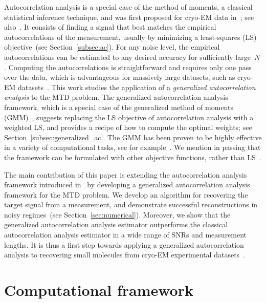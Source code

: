\documentclass{article}
\begin{document}
Autocorrelation analysis is a special case of the method of moments, a classical statistical inference technique, {and was first proposed for cryo-EM data in~\cite{kam1980reconstruction}; see also~\cite{bhamre2015orthogonal,bhamre2017anisotropic,levin20183d}}. It consists of finding a signal that best matches the empirical autocorrelations of the measurement, {usually} by minimizing a least-squares (LS) objective~(see Section~\ref{subsec:ac}). For any noise level, the empirical autocorrelations can be estimated to any desired accuracy for sufficiently large~$N$. Computing the autocorrelations is straightforward and requires only one pass over the data, which is advantageous for massively large datasets, such as \mbox{cryo-EM} datasets~\cite{bendory2020single}. This work studies the application of a \textit{generalized autocorrelation analysis} to the MTD problem. The generalized autocorrelation analysis framework, which is a special case of the generalized method of moments (GMM)~\cite{Hansen1982}, suggests replacing the LS objective of autocorrelation analysis with a weighted LS, and provides a recipe of how to compute the optimal weights; see Section~\ref{subsec:generalized_ac}. The GMM has been proven to be highly effective in a variety of computational tasks, see for example~\cite{wooldridge2001applications,akbar2016more,fan2018optimal,roodman2009xtabond2,abas2021generalized}. We {mention in passing} that the framework can be formulated with other objective functions, rather than LS~\cite{de2002properties}.

The main contribution of this paper is extending the autocorrelation analysis framework introduced in~\cite{bendory2019multi} by developing a generalized autocorrelation analysis framework for the MTD problem. We develop an algorithm for recovering the target signal from a measurement, and demonstrate successful reconstructions in noisy regimes~(see Section~\ref{sec:numerical}). Moreover, we show that the generalized autocorrelation analysis estimator outperforms the classical autocorrelation analysis estimator in {a wide range of} SNRs and measurement lengths. It is thus
a first step towards applying a generalized autocorrelation analysis to recovering small molecules from \mbox{cryo-EM} {experimental datasets}~\cite{bendory2018toward}.

\section{Computational framework}
\label{sec:math}
\end{document}
